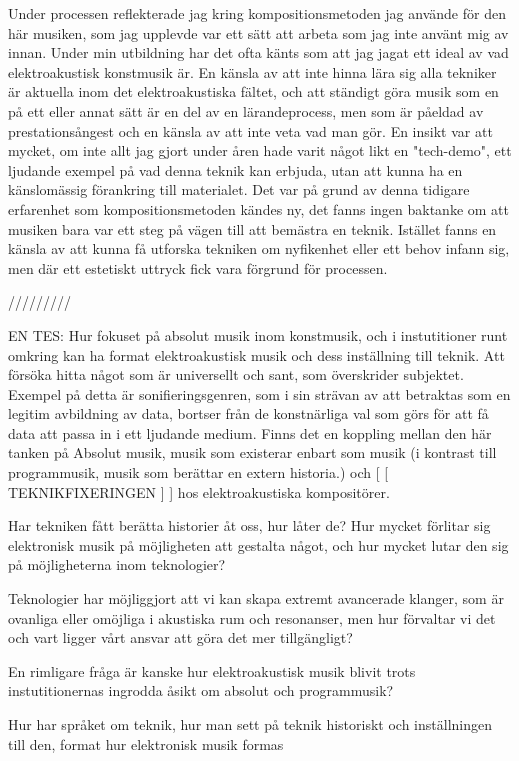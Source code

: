 \documentclass{article}
\begin{document}
Under processen reflekterade jag kring kompositionsmetoden jag använde för den här musiken, som jag upplevde
var ett sätt att arbeta som jag inte använt mig av innan. Under min utbildning har det ofta känts
som att jag jagat ett ideal av vad elektroakustisk konstmusik är. En känsla av att inte hinna lära sig alla
tekniker är aktuella inom det elektroakustiska fältet, och att ständigt göra musik som en på ett eller annat
sätt är en del av en lärandeprocess, men som är påeldad av prestationsångest och en känsla av att inte veta
vad man gör. En insikt var att mycket, om inte allt jag gjort under åren hade varit något likt en "tech-demo",
ett ljudande exempel på vad denna teknik kan erbjuda, utan att kunna ha en känslomässig förankring till
materialet. Det var på grund av denna tidigare erfarenhet som kompositionsmetoden kändes ny, det fanns ingen
baktanke om att musiken bara var ett steg på vägen till att bemästra en teknik. Istället fanns en känsla av
att kunna få utforska tekniken om nyfikenhet eller ett behov infann sig, men där ett estetiskt uttryck fick
vara förgrund för processen.

/////////

EN TES: Hur fokuset på absolut musik inom konstmusik, och i instutitioner runt omkring kan ha format
elektroakustisk musik och dess inställning till teknik. 
Att försöka hitta något som är universellt och sant, som överskrider subjektet. Exempel på detta är
sonifieringsgenren, som i sin strävan av att betraktas som en legitim avbildning av data, bortser från de
konstnärliga val som görs för att få data att passa in i ett ljudande medium. Finns det en koppling mellan den
här tanken på Absolut musik, musik som existerar enbart som musik (i kontrast till programmusik, musik som
berättar en extern historia.) och [ [ TEKNIKFIXERINGEN ] ] hos elektroakustiska kompositörer. 

Har tekniken fått berätta historier åt oss, hur låter de? Hur mycket förlitar sig elektronisk musik på
möjligheten att gestalta något, och hur mycket lutar den sig på möjligheterna inom teknologier?

Teknologier har möjliggjort att vi kan skapa extremt avancerade klanger, som är ovanliga eller omöjliga i
akustiska rum och resonanser, men hur förvaltar vi det och vart ligger vårt ansvar att göra det mer
tillgängligt?

En rimligare fråga är kanske hur elektroakustisk musik blivit trots instutitionernas ingrodda åsikt om absolut
och programmusik?

Hur har språket om teknik, hur man sett på teknik historiskt och inställningen till den, format hur
elektronisk musik formas
\end{document}
